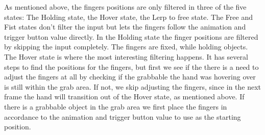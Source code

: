 
As mentioned above, the fingers positions are only filtered in three of the five states: The Holding state, the Hover state, the Lerp to free state. The Free and Fist states don't filter the input but lets the fingers follow the animation and trigger button value directly. In the Holding state the finger positions are filtered by skipping the input completely. The fingers are fixed, while holding objects. The Hover state is where the most interesting filtering happens. It has several steps to find the positions for the fingers, but first we see if the there is a need to adjust the fingers at all by checking if the grabbable the hand was hovering over is still within the grab area. If not, we skip adjusting the fingers, since in the next frame the hand will transition out of the Hover state, as mentioned above. If there is a grabbable object in the grab area we first place the fingers in accordance to the animation and trigger button value to use as the starting position.

